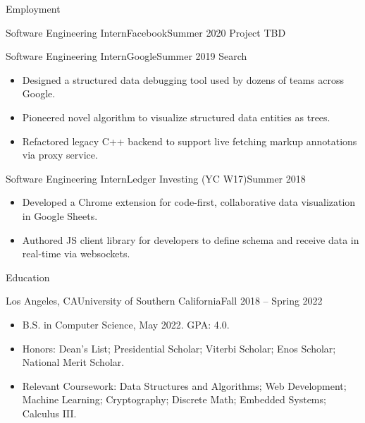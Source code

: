 \documentclass[calibri]{mcdowellcv}
\begin{document}
\makeheader

\begin{cvsection}{Employment}
	\begin{cvsubsection}{Software Engineering Intern}{Facebook}{Summer 2020}
		Project TBD
	\end{cvsubsection}

	\begin{cvsubsection}{Software Engineering Intern}{Google}{Summer 2019}
		Search
		\begin{itemize}
			\item Designed a structured data debugging tool used by dozens of teams across Google.
			\item Pioneered novel algorithm to visualize structured data entities as trees.
			\item Refactored legacy C++ backend to support live fetching markup annotations via proxy service.
		\end{itemize}
	\end{cvsubsection}

	\begin{cvsubsection}{Software Engineering Intern}{Ledger Investing (YC W17)}{Summer 2018}
		\begin{itemize}
			\item Developed a Chrome extension for code-first, collaborative data visualization in Google Sheets.
			\item Authored JS client library for developers to define schema and receive data in real-time via websockets.
		\end{itemize}
	\end{cvsubsection}
\end{cvsection}

\begin{cvsection}{Education}
	\begin{cvsubsection}{Los Angeles, CA}{University of Southern California}{Fall 2018 -- Spring 2022}
		\begin{itemize}
			\item B.S. in Computer Science, May 2022.  GPA: 4.0.
			\item Honors: Dean's List; Presidential Scholar; Viterbi Scholar; Enos Scholar; National Merit Scholar.
			\item Relevant Coursework: Data Structures and Algorithms; Web Development; Machine Learning; Cryptography; Discrete Math; Embedded Systems; Calculus III.
		\end{itemize}
	\end{cvsubsection}
\end{cvsection}
\end{document}
